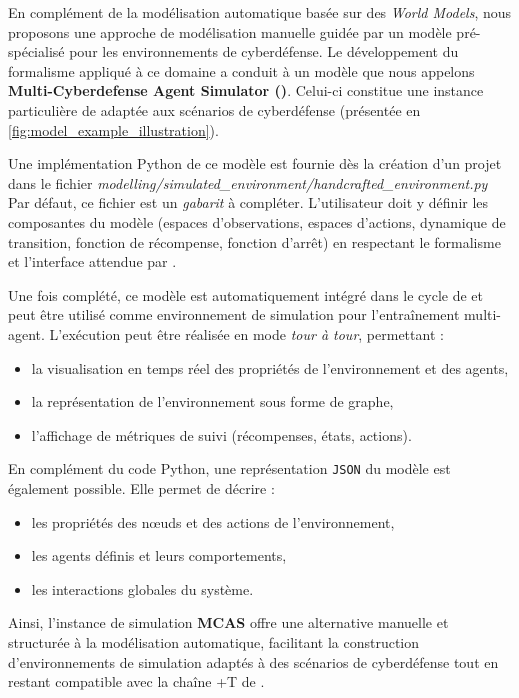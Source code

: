 En complément de la modélisation automatique basée sur des \textit{World Models}, nous proposons une approche de modélisation manuelle guidée par un modèle pré-spécialisé pour les environnements de cyberdéfense.
Le développement du formalisme  appliqué à ce domaine a conduit à un modèle que nous appelons \textbf{Multi-Cyberdefense Agent Simulator ()}. Celui-ci constitue une instance particulière de  adaptée aux scénarios de cyberdéfense (présentée en \autoref{fig:model_example_illustration}).

Une implémentation Python de ce modèle est fournie dès la création d’un projet dans le fichier
\textit{modelling/simulated\_environment/handcrafted\_environment.py}
Par défaut, ce fichier est un \textit{gabarit} à compléter. L’utilisateur doit y définir les composantes du modèle (espaces d’observations, espaces d’actions, dynamique de transition, fonction de récompense, fonction d’arrêt) en respectant le formalisme  et l’interface attendue par .


Une fois complété, ce modèle est automatiquement intégré dans le cycle de  et peut être utilisé comme environnement de simulation pour l’entraînement multi-agent. L’exécution peut être réalisée en mode \textit{tour à tour}, permettant :
\begin{itemize}
  \item la visualisation en temps réel des propriétés de l’environnement et des agents,
  \item la représentation de l’environnement sous forme de graphe,
  \item l’affichage de métriques de suivi (récompenses, états, actions).
\end{itemize}
En complément du code Python, une représentation \texttt{JSON} du modèle est également possible. Elle permet de décrire :
\begin{itemize}
  \item les propriétés des nœuds et des actions de l’environnement,
  \item les agents définis et leurs comportements,
  \item les interactions globales du système.
\end{itemize}

\medskip
Ainsi, l'instance de simulation \textbf{MCAS} offre une alternative manuelle et structurée à la modélisation automatique, facilitant la construction d’environnements de simulation adaptés à des scénarios de cyberdéfense tout en restant compatible avec la chaîne +T de .

